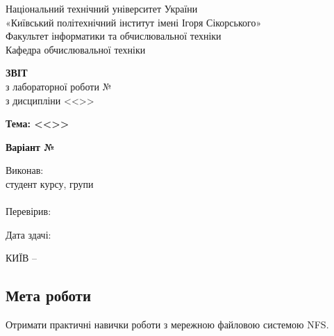 \documentclass[14pt, a4paper]{extreport}
\begin{document}
	
	\begin{titlepage}
		\begin{center}
			\normalsize
			Національний технічний університет України\\
			«Київський політехнічний інститут імені Ігоря Сікорського» \\[0.5em]
			Факультет інформатики та обчислювальної техніки\\
			Кафедра обчислювальної техніки
			
			\vfill
			
			{\large \textbf{ЗВІТ}\\[0.5em]}
			{з лабораторної роботи №\LabNumber \\}
			{з дисципліни <<\CourseTitle>>}
			
			\vspace{2em}
			
			{\textbf{Тема: <<\Topic>>}}
			
			\vspace{1em}
			
			{\textbf{Варіант №\Variant}}
			
			\vfill
			
			\begin{flushright}
				Виконав: \\ студент \CourseNumber{} курсу, групи \StudentGroup \\
				\StudentName \\[1em]
				Перевірив: \\ \Teacher
			\end{flushright}
			
			\vfill
			
			\begin{flushright}
				Дата здачі: \DTMtoday
			\end{flushright}
			
			\vspace{5em}
			КИЇВ -- \ReportYear
		\end{center}
	\end{titlepage}
	
	\clearpage
	\setcounter{page}{2}
	
	\subsection*{Мета роботи} 
	
	Отримати практичні навички роботи з мережною файловою системою NFS.
	
\end{document}
